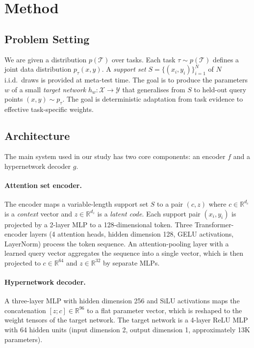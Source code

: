 \section{Method}\label{sec:method}

\subsection{Problem Setting}

We are given a distribution $p(\mathcal{T})$ over tasks.
Each task $\tau \sim p(\mathcal{T})$ defines a joint data distribution $p_\tau(x, y)$.
A \emph{support set} $S = \{(x_i, y_i)\}_{i=1}^N$ of $N$ i.i.d.\ draws is provided at meta-test time.
The goal is to produce the parameters $w$ of a small \emph{target network} $h_w : \mathcal{X} \rightarrow \mathcal{Y}$ that generalises from $S$ to held-out query points $(x, y) \sim p_\tau$.
The goal is deterministic adaptation from task evidence to effective task-specific weights.

\subsection{Architecture}

The main system used in our study has two core components: an encoder $f$ and a hypernetwork decoder $g$.

\paragraph{Attention set encoder.}
The encoder maps a variable-length support set $S$ to a pair $(c, z)$ where $c \in \mathbb{R}^{d_c}$ is a \emph{context} vector and $z \in \mathbb{R}^{d_z}$ is a \emph{latent code}.
Each support pair $(x_i, y_i)$ is projected by a 2-layer MLP to a 128-dimensional token.
Three Transformer-encoder layers (4 attention heads, hidden dimension 128, GELU activations, LayerNorm) process the token sequence.
An attention-pooling layer with a learned query vector aggregates the sequence into a single vector, which is then projected to $c \in \mathbb{R}^{64}$ and $z \in \mathbb{R}^{32}$ by separate MLPs.

\paragraph{Hypernetwork decoder.}
A three-layer MLP with hidden dimension 256 and SiLU activations maps the concatenation $[z; c] \in \mathbb{R}^{96}$ to a flat parameter vector, which is reshaped to the weight tensors of the target network.
The target network is a 4-layer ReLU MLP with 64 hidden units (input dimension 2, output dimension 1, approximately 13K parameters).

